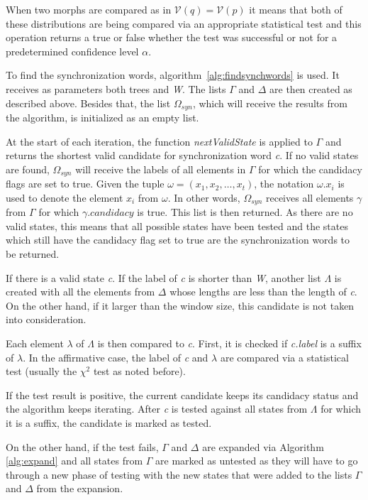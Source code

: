 {When two morphs are compared as in $\mathcal{V}(q) = \mathcal{V}(p)$ it means that both of these distributions are being compared via an appropriate statistical test and this operation returns a true or false whether the test was successful or not for a predetermined confidence level $\alpha$.

To find the synchronization words, algorithm~\ref{alg:findsynchwords} is used. It receives as parameters both trees and \textit{W}. The lists $\Gamma$ and $\Delta$ are then created as described above. Besides that, the list $\Omega_{syn}$, which will receive the results from the algorithm, is initialized as an empty list.

At the start of each iteration, the function \textit{nextValidState} is applied to $\Gamma$ and returns the shortest valid candidate for synchronization word \textit{c}. If no valid states are found, $\Omega_{syn}$ will receive the labels of all elements in $\Gamma$ for which the candidacy flags are set to true. Given the tuple $\omega = (x_1, x_2, \ldots, x_t)$, the notation $\omega.x_i$ is used to denote the element $x_i$ from $\omega$. In other words, $\Omega_{syn}$ receives all elements $\gamma$ from $\Gamma$ for which $\gamma.candidacy$ is true. This list is then returned. As there are no valid states, this means that all possible states have been tested and the states which still have the candidacy flag set to true are the synchronization words to be returned.

If there is a valid state \textit{c}. If the label of \textit{c} is shorter than \textit{W}, another list $\Lambda$ is created with all the elements from $\Delta$ whose lengths are less than the length of \textit{c}. On the other hand, if it larger than the window size, this candidate is not taken into consideration.

Each element $\lambda$ of $\Lambda$ is then compared to \textit{c}. First, it is checked if \textit{c.label} is a suffix of $\lambda$. In the affirmative case, the label of \textit{c} and $\lambda$ are compared via a statistical test (usually the $\chi^2$ test as noted before).

If the test result is positive, the current candidate keeps its candidacy status and the algorithm keeps iterating. After \textit{c} is tested against all states from $\Lambda$ for which it is a suffix, the candidate is marked as tested.

On the other hand, if the test fails, $\Gamma$ and $\Delta$ are expanded via Algorithm \ref{alg:expand} and all states from $\Gamma$ are marked as untested as they will have to go through a new phase of testing with the new states that were added to the lists $\Gamma$ and $\Delta$ from the expansion.

}
